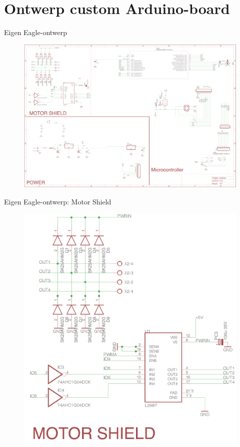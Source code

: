 \documentclass[t,12pt,english
\ifx\beamermode\undefined\else,\beamermode\fi
]{beamer}
\begin{document}
\section{Ontwerp custom Arduino-board}\label{sec:pcb}

\begin{frame}{Eigen Eagle-ontwerp}
\begin{figure}[H]
	\centering
	\includegraphics[width=\textwidth,height=0.8\textheight,keepaspectratio]{eigenschematic.png}
\end{figure}
\end{frame}

\begin{frame}{Eigen Eagle-ontwerp: Motor Shield}
\begin{figure}[H]
	\centering
	\includegraphics[width=\textwidth,height=0.8\textheight,keepaspectratio]{eigenschematicdeel1.png}
\end{figure}
\end{frame}
\end{document}
